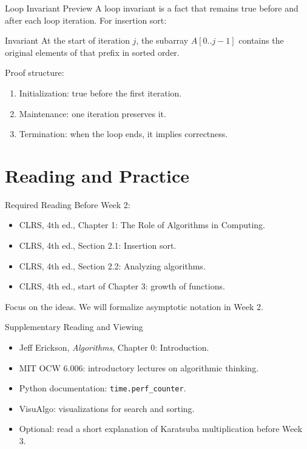 \documentclass[aspectratio=169,xcolor=dvipsnames]{beamer}
\begin{document}
\begin{frame}{Loop Invariant Preview}
  A loop invariant is a fact that remains true before and after each loop iteration.
  \vspace{0.5em}
  For insertion sort:
  \begin{block}{Invariant}
    At the start of iteration $j$, the subarray $A[0..j-1]$ contains the original elements of that prefix in sorted order.
  \end{block}
  \vspace{0.5em}
  Proof structure:
  \begin{enumerate}
    \item Initialization: true before the first iteration.
    \item Maintenance: one iteration preserves it.
    \item Termination: when the loop ends, it implies correctness.
  \end{enumerate}
\end{frame}

\section{Reading and Practice}

\begin{frame}{Required Reading}
  Before Week 2:
  \begin{itemize}
    \item CLRS, 4th ed., Chapter 1: The Role of Algorithms in Computing.
    \item CLRS, 4th ed., Section 2.1: Insertion sort.
    \item CLRS, 4th ed., Section 2.2: Analyzing algorithms.
    \item CLRS, 4th ed., start of Chapter 3: growth of functions.
  \end{itemize}
  \vspace{0.5em}
  Focus on the ideas. We will formalize asymptotic notation in Week 2.
\end{frame}

\begin{frame}{Supplementary Reading and Viewing}
  \begin{itemize}
    \item Jeff Erickson, \textit{Algorithms}, Chapter 0: Introduction.
    \item MIT OCW 6.006: introductory lectures on algorithmic thinking.
    \item Python documentation: \texttt{time.perf\_counter}.
    \item VisuAlgo: visualizations for search and sorting.
    \item Optional: read a short explanation of Karatsuba multiplication before Week 3.
  \end{itemize}
\end{frame}
\end{document}
